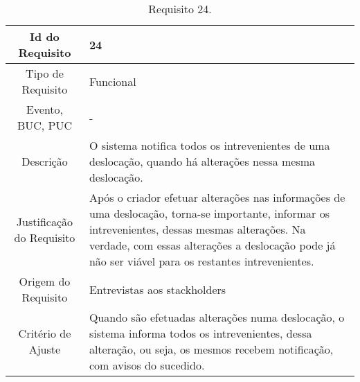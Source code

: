 \begin{table}[H]
\begin{center}
  \begin{tabularx}{\textwidth}{ | c | X | }
    \hline
    Id do Requisito & 24  \\
    
    \hline
    Tipo de Requisito & Funcional \\
    
    \hline
    Evento, BUC, PUC &  - \\
    
    \hline
    Descrição & O sistema notifica todos os intrevenientes de uma deslocação, quando há alterações nessa mesma deslocação. \\
    
    \hline
    Justificação do Requisito & Após o criador efetuar alterações nas informações de uma deslocação, torna-se importante, informar os intrevenientes, dessas mesmas alterações. Na verdade, com essas alterações a deslocação pode já não ser viável para os restantes intrevenientes. \\
    
    \hline
    Origem do Requisito & Entrevistas aos stackholders\\
    
    \hline
    Critério de Ajuste & Quando são efetuadas alterações numa deslocação, o sistema informa todos os intrevenientes, dessa alteração, ou seja, os mesmos recebem notificação, com avisos do sucedido. \\
    
    \hline
  \end{tabularx}
  \caption{Requisito 24.} \label{tab:r3}
\end{center}
\end{table}


